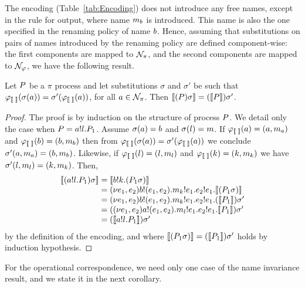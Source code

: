 The encoding (Table~\ref{tab:Encoding}) does not introduce any free names, except in the rule for output, where name $m_b$ is introduced. This name is also the one specified in the renaming policy of name $b$. Hence, assuming that substitutions on pairs of names introduced by the renaming policy are defined component-wise: the first components are mapped to ${\cal N}_\pi$, and the second components are mapped to ${\cal N}_\varphi$, we have the following result. %

\begin{lemma} Let $P$ be a $\pi$ process and let substitutions $\sigma$ and $\sigma'$ be such that $\varphi_{\llbracket \; \rrbracket}(\sigma(a))=\sigma'(\varphi_{\llbracket \; \rrbracket}(a))$, for all $a\in{\cal N}_\pi$.
Then $\llbracket (P)\sigma \rrbracket=(\llbracket P \rrbracket)\sigma'$.
\end{lemma}
\begin{proof}
The proof is by induction on the structure of process $P$. We detail only the case when $P=a!l.P_1$. 
Assume $\sigma(a)=b$ and $\sigma(l)=m$. If $\varphi_{\llbracket \; \rrbracket}(a)=(a, m_a)$ and $\varphi_{\llbracket \; \rrbracket}(b)=(b, m_b)$ then from $\varphi_{\llbracket \; \rrbracket}(\sigma(a))=\sigma'(\varphi_{\llbracket \; \rrbracket}(a))$ we conclude $\sigma'(a, m_a)=(b, m_b)$. Likewise, if $\varphi_{\llbracket \; \rrbracket}(l)=(l, m_l)$ and $\varphi_{\llbracket \; \rrbracket}(k)=(k, m_k)$ we have $\sigma'(l, m_l)=(k, m_k)$. Then,
\[
\begin{array}{l@{\;}c@{\;}l}
\enc{(\send\NA\role\msg\NL.\PP_1)\sigma} 
& = & \enc{\send\NB\role\msg\NK.(\PP_1\sigma)}\\
& = & \rest{\NE_1,\NE_2} \send{\NB}\role\msg{(\NE_1,\NE_2)}.\send{\NM_\NK}\role\msg{\NE_1}.\send{\NE_2}\role\msg{\NE_1}. \enc{ (\PP_1\sigma) } \\
& = & \rest{\NE_1,\NE_2} \send{\NB}\role\msg{(\NE_1,\NE_2)}.\send{\NM_\NK}\role\msg{\NE_1}.\send{\NE_2}\role\msg{\NE_1}. (\enc{ \PP_1 })\sigma'\\
& = & (\rest{\NE_1,\NE_2} \send{\NA}\role\msg{(\NE_1,\NE_2)}.\send{\NM_\NL}\role\msg{\NE_1}.\send{\NE_2}\role\msg{\NE_1}. \enc{ \PP_1 })\sigma'\\
& = & (\enc{\send\NA\role\msg\NL.\PP_1})\sigma'
\end{array}
\]
by the definition of the encoding, and where $\llbracket  (P_1\sigma)  \rrbracket=(\llbracket  P_1  \rrbracket)\sigma'$ holds by induction hypothesis.
\end{proof}


For the operational correspondence, we need only one case of the name invariance result, and we state it in the next corollary.

